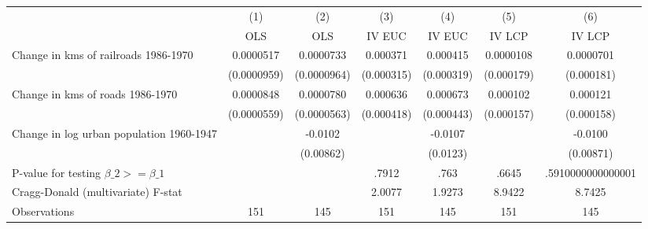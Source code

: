 {
\def\sym#1{\ifmmode^{#1}\else\(^{#1}\)\fi}
\begin{tabular}{l*{6}{c}}
\hline\hline
                &\multicolumn{1}{c}{(1)}&\multicolumn{1}{c}{(2)}&\multicolumn{1}{c}{(3)}&\multicolumn{1}{c}{(4)}&\multicolumn{1}{c}{(5)}&\multicolumn{1}{c}{(6)}\\
                &\multicolumn{1}{c}{OLS}&\multicolumn{1}{c}{OLS}&\multicolumn{1}{c}{IV EUC}&\multicolumn{1}{c}{IV EUC}&\multicolumn{1}{c}{IV LCP}&\multicolumn{1}{c}{IV LCP}\\
\hline
Change in kms of railroads 1986-1970&0.0000517         &0.0000733         & 0.000371         & 0.000415         &0.0000108         &0.0000701         \\
                &(0.0000959)         &(0.0000964)         &(0.000315)         &(0.000319)         &(0.000179)         &(0.000181)         \\
[1em]
Change in kms of roads 1986-1970&0.0000848         &0.0000780         & 0.000636         & 0.000673         & 0.000102         & 0.000121         \\
                &(0.0000559)         &(0.0000563)         &(0.000418)         &(0.000443)         &(0.000157)         &(0.000158)         \\
[1em]
Change in log urban population 1960-1947&                  &  -0.0102         &                  &  -0.0107         &                  &  -0.0100         \\
                &                  &(0.00862)         &                  & (0.0123)         &                  &(0.00871)         \\
\hline
P-value for testing $\beta\_{2} >= \beta\_{1}$&                  &                  &    .7912         &     .763         &    .6645         &.5910000000000001         \\
Cragg-Donald (multivariate) F-stat&                  &                  &   2.0077         &   1.9273         &   8.9422         &   8.7425         \\
Observations    &      151         &      145         &      151         &      145         &      151         &      145         \\
\hline\hline
\end{tabular}
}
